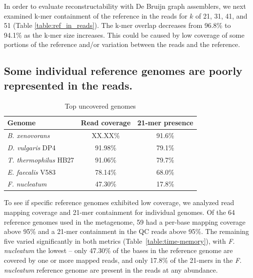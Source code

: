 \documentclass[10pt,a4paper,twocolumn]{article}
\begin{document}
In order to evaluate reconstructability with De Bruijn graph
assemblers, we next examined k-mer containment of the reference in the
reads for $k$ of 21, 31, 41, and 51 (Table \ref{table:ref_in_reads}).
The k-mer overlap decreases from 96.8\% to 94.1\% as the k-mer size
increases. This could be caused by low coverage of some portions
of the reference and/or variation between the reads and the reference.



\subsection*{Some individual reference genomes are poorly represented in the reads.}

\begin{table}[!h]
\centering
\caption{Top uncovered genomes}
\begin{tabular}{|l|c|c|}\hline
\textbf{Genome} & \textbf {Read coverage} & \textbf{21-mer presence} \\ \hline 
{{\em B. xenovorans}} & XX.XX\% & 91.6\% \\
\hline
{{\em D. vulgaris} DP4}  & 91.98\% & 79.1\% \\
\hline
{{\em T. thermophilus} HB27}  & 91.06\% & 79.7\% \\
\hline    
{{\em E. faecalis} V583}  & 78.14\% & 68.0\% \\
\hline
{{\em F. nucleatum}}  & 47.30\% & 17.8\% \\
\hline
\end{tabular}
\label{table:genomes_uncovered-analysis}
\end{table}



To see if specific reference genomes exhibited low coverage, we
analyzed read mapping coverage and 21-mer containment for individual
genomes.  Of the 64 reference genomes used in the metagenome, 59 had a
per-base mapping coverage above 95\% and a 21-mer containment in the
QC reads above 95\%.  The remaining five varied significantly in both
metrics (Table~\ref{table:time-memory}), with {\em F. nucleatum} the
lowest -- only 47.30\% of the bases in the reference genome are
covered by one or more mapped reads, and only 17.8\% of the 21-mers in
the {\em F. nucleatum} reference genome are present in the reads at
any abundance.
\end{document}
